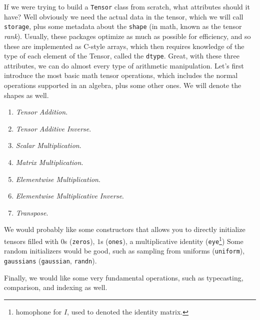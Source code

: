   If we were trying to build a \texttt{Tensor} class from scratch, what attributes should it have? Well obviously we need the actual data in the tensor, which we will call \texttt{storage}, plus some metadata about the \texttt{shape} (in math, known as the tensor \textit{rank}). Usually, these packages optimize as much as possible for efficiency, and so these are implemented as C-style arrays, which then requires knowledge of the type of each element of the Tensor, called the \texttt{dtype}. Great, with these three attributes, we can do almost every type of arithmetic manipulation. Let's first introduce the most basic math tensor operations, which includes the normal operations supported in an algebra, plus some other ones. We will denote the shapes as well. 
  \begin{enumerate}
    \item \textit{Tensor Addition}. 
    \item \textit{Tensor Additive Inverse}. 
    \item \textit{Scalar Multiplication}. 
    \item \textit{Matrix Multiplication}. 
    \item \textit{Elementwise Multiplication}. 
    \item \textit{Elementwise Multiplicative Inverse}.  
    \item \textit{Transpose}. 
  \end{enumerate} 

  We would probably like some constructors that allows you to directly initialize tensors filled with $0$s (\texttt{zeros}), $1$s (\texttt{ones}), a multiplicative identity (\texttt{eye}\footnote{homophone for $I$, used to denoted the identity matrix.}) Some random initializers would be good, such as sampling from uniforms (\texttt{uniform}), \texttt{gaussians} (\texttt{gaussian}, \texttt{randn}). 

  Finally, we would like some very fundamental operations, such as typecasting, comparison, and indexing as well. 

